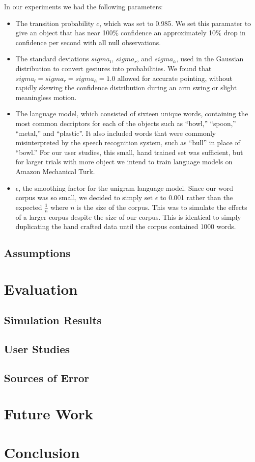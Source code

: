 \documentclass[a4paper, 11pt]{article} %
\begin{document}
In our experiments we had the following parameters:\begin{itemize}
\item The transition probability $c$, which was set to 0.985. We set this paramater to give an object that has near 100\% confidence an approximately 10\% drop in confidence per second with all null observations.
\item The standard deviations $sigma_l$, $sigma_r$, and $sigma_h$, used in the Gaussian distribution to convert gestures into probabilities. We found that $sigma_l = sigma_r = sigma_h = 1.0$ allowed for accurate pointing, without rapidly skewing the confidence distribution during an arm swing or slight meaningless motion.
\item The language model, which consisted of sixteen unique words, containing the most common decriptors for each of the objects such as ``bowl,'' ``spoon,'' ``metal,'' and ``plastic''. It also included words that were commonly misinterpreted by the speech recognition system, such as ``bull'' in place of ``bowl.'' For our user studies, this small, hand trained set was sufficient, but for larger trials with more object we intend to train language models on Amazon Mechanical Turk.
\item $\epsilon$, the smoothing factor for the unigram language model. Since our word corpus was so small, we decided to simply set $\epsilon$ to 0.001 rather than the expected $\frac{1}{n}$ where $n$ is the size of the corpus. This was to simulate the effects of a larger corpus despite the size of our corpus. This is identical to simply duplicating the hand crafted data until the corpus contained 1000 words.
\end{itemize}
\subsection{Assumptions}
\section{Evaluation}
\subsection{Simulation Results}
\subsection{User Studies}
\subsection{Sources of Error}
\section{Future Work}
\section{Conclusion}
\end{document}
